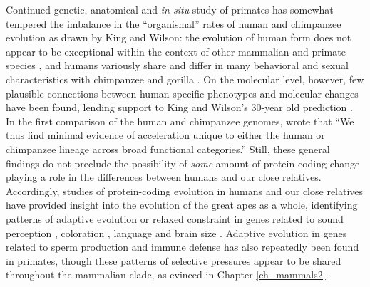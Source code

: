 Continued genetic, anatomical and \emph{in situ} study of primates has
somewhat tempered the imbalance in the ``organismal'' rates of human
and chimpanzee evolution as drawn by King and Wilson: the evolution of
human form does not appear to be exceptional within the context of
other mammalian and primate species \citep{Carroll2003}, and humans
variously share and differ in many behavioral and sexual
characteristics with chimpanzee and gorilla
\citep{Harcourt1980,Goodall1986,Vigilant2004}. On the molecular level,
however, few plausible connections between human-specific phenotypes
and molecular changes have been found, lending support to King and
Wilson's 30-year old prediction
\citep{Clark2003,Sequencing2005a,Bradley2008}. In the first comparison
of the human and chimpanzee genomes, \citet{Sequencing2005a} wrote
that ``We thus find minimal evidence of acceleration unique to either
the human or chimpanzee lineage across broad functional categories.''
Still, these general findings do not preclude the possibility of
\emph{some} amount of protein-coding change playing a role in the
differences between humans and our close relatives. Accordingly,
studies of protein-coding evolution in humans and our close relatives
have provided insight into the evolution of the great apes as a whole,
identifying patterns of adaptive evolution or relaxed constraint in
genes related to sound perception \citep{Clark2003}, coloration
\citep{Mundy2007}, language \citep{Enard2002} and brain size
\citep{Montgomery2011}. Adaptive evolution in genes related to sperm
production \citep{Clark2005} and immune defense \citep{Sawyer2005a}
has also repeatedly been found in primates, though these patterns of
selective pressures appear to be shared throughout the mammalian
clade, as evinced in Chapter \ref{ch_mammals2}.

